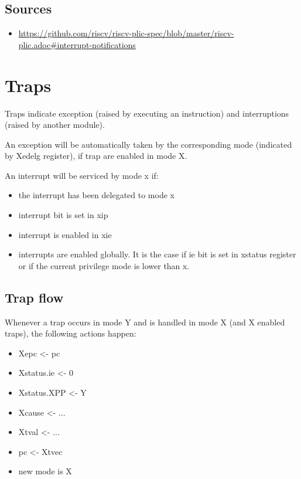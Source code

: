 \documentclass[10pt, a4paper]{article}
\begin{document}
\subsection{Sources}

\begin{itemize}
\item \href{https://github.com/riscv/riscv-plic-spec/blob/master/riscv-plic.adoc#interrupt-notification}{https://github.com/riscv/riscv-plic-spec/blob/master/riscv-plic.adoc\#interrupt-notifications}
\end{itemize}

\section{Traps}

Traps indicate exception (raised by executing an instruction) and interruptions (raised by another module).

An exception will be automatically taken by the corresponding mode (indicated by Xedelg register), if trap are enabled in mode X.

An interrupt will be serviced by mode x if:
\begin{itemize}
\item the interrupt has been delegated to mode x
\item interrupt bit is set in xip
\item interrupt is enabled in xie
\item interrupts are enabled globally. It is the case if ie bit is set in xstatus register or if the current privilege mode is lower than x.
\end{itemize}

\subsection{Trap flow}

Whenever a trap occurs in mode Y and is handled in mode X (and X enabled traps), the following actions happen:
\begin{itemize}
\item Xepc <- pc
\item Xstatus.ie <- 0
\item Xstatus.XPP <- Y
\item Xcause <- ...
\item Xtval <- ... 
\item pc <- Xtvec
\item new mode is X
\end{itemize}
\end{document}
